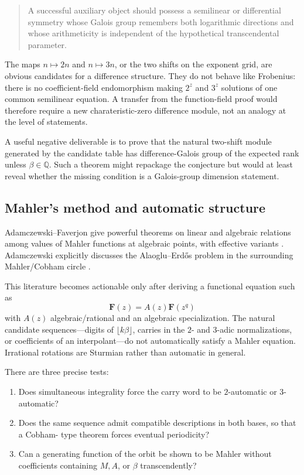 \documentclass[10pt,letterpaper]{article}
\newcommand{\Q}{\mathbb Q}
\begin{document}
\begin{quote}
A successful auxiliary object should possess a semilinear or differential symmetry whose
Galois group remembers both logarithmic directions and whose arithmeticity is independent of
the hypothetical transcendental parameter.
\end{quote}

The maps \(n\mapsto2n\) and \(n\mapsto3n\), or the two shifts on the exponent grid, are
obvious candidates for a difference structure.  They do not behave like Frobenius: there is
no coefficient-field endomorphism making \(2^z\) and \(3^z\) solutions of one common
semilinear equation.  A transfer from the function-field proof would therefore require a new
charateristic-zero difference module, not an analogy at the level of statements.

A useful negative deliverable is to prove that the natural two-shift module generated by the
candidate table has difference-Galois group of the expected rank unless
\(\beta\in\Q\).  Such a theorem might repackage the conjecture but would at least reveal
whether the missing condition is a Galois-group dimension statement.

\subsection{Mahler's method and automatic structure}

Adamczewski--Faverjon give powerful theorems on linear and algebraic relations among values of
Mahler functions at algebraic points, with effective variants
\cite{AdamczewskiFaverjon2017,AdamczewskiFaverjon2018}.  Adamczewski explicitly discusses the
Alaoglu--Erd\H{o}s problem in the surrounding Mahler/Cobham circle
\cite{AdamczewskiMahlerProblem}.

This literature becomes actionable only after deriving a functional equation such as
\[
  \mathbf F(z)=A(z)\mathbf F(z^q)
\]
with \(A(z)\) algebraic/rational and an algebraic specialization.  The natural candidate
sequences---digits of \(\lfloor k\beta\rfloor\), carries in the \(2\)- and \(3\)-adic
normalizations, or coefficients of an interpolant---do not automatically satisfy a Mahler
equation.  Irrational rotations are Sturmian rather than automatic in general.

There are three precise tests:

\begin{enumerate}
\item Does simultaneous integrality force the carry word to be \(2\)-automatic or
\(3\)-automatic?
\item Does the same sequence admit compatible descriptions in both bases, so that a Cobham-
type theorem forces eventual periodicity?
\item Can a generating function of the orbit be shown to be Mahler without coefficients
containing \(M,A\), or \(\beta\) transcendently?
\end{enumerate}
\end{document}
